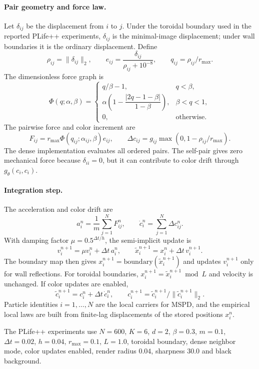 \paragraph{Pair geometry and force law.}
Let $\delta_{ij}$ be the displacement from $i$ to $j$.  Under the toroidal boundary used in the reported PLife++ experiments, $\delta_{ij}$ is the minimal-image displacement; under wall boundaries it is the ordinary displacement.  Define
\[
  \rho_{ij}=\|\delta_{ij}\|_2,
  \qquad
  e_{ij}=\frac{\delta_{ij}}{\rho_{ij}+10^{-8}},
  \qquad
  q_{ij}=\rho_{ij}/r_{\max}.
\]
The dimensionless force graph is
\[
\Phi(q;\alpha,\beta)=
\begin{cases}
  q/\beta-1, & q<\beta,\\[1mm]
  \alpha\left(1-\dfrac{|2q-1-\beta|}{1-\beta}\right), & \beta<q<1,\\[2mm]
  0, & \text{otherwise}.
\end{cases}
\]
The pairwise force and color increment are
\[
  F_{ij}=r_{\max}\Phi(q_{ij};\alpha_{ij},\beta)e_{ij},
  \qquad
  \Delta c_{ij}=g_{ij}\max(0,1-\rho_{ij}/r_{\max}).
\]
The dense implementation evaluates all ordered pairs.  The self-pair gives zero mechanical force because $\delta_{ii}=0$, but it can contribute to color drift through $g_\theta(c_i,c_i)$.

\paragraph{Integration step.}
The acceleration and color drift are
\[
  a_i^n=\frac{1}{m}\sum_{j=1}^{N}F_{ij}^n,
  \qquad
  \dot c_i^n=\sum_{j=1}^{N}\Delta c_{ij}^n.
\]
With damping factor $\mu=0.5^{\Delta t/h}$, the semi-implicit update is
\[
  v_i^{n+1}=\mu v_i^n+\Delta t\,a_i^n,
  \qquad
  \widetilde x_i^{n+1}=x_i^n+\Delta t\,v_i^{n+1}.
\]
The boundary map then gives $x_i^{n+1}=\mathrm{boundary}(\widetilde x_i^{n+1})$ and updates $v_i^{n+1}$ only for wall reflections.  For toroidal boundaries, $x_i^{n+1}=\widetilde x_i^{n+1}\bmod L$ and velocity is unchanged.  If color updates are enabled,
\[
  \widetilde c_i^{n+1}=c_i^n+\Delta t\,\dot c_i^n,
  \qquad
  c_i^{n+1}=\widetilde c_i^{n+1}/\|\widetilde c_i^{n+1}\|_2.
\]
Particle identities $i=1,\ldots,N$ are the local carriers for MSPD, and the empirical local laws are built from finite-lag displacements of the stored positions $x_i^n$.

The PLife++ experiments use $N=600$, $K=6$, $d=2$, $\beta=0.3$, $m=0.1$, $\Delta t=0.02$, $h=0.04$, $r_{\max}=0.1$, $L=1.0$, toroidal boundary, dense neighbor mode, color updates enabled, render radius $0.04$, sharpness $30.0$ and black background.



